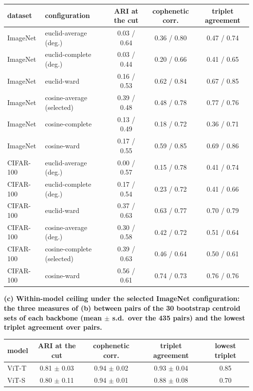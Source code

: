 \begin{table}[H]
\setlength{\tabcolsep}{3pt}
\begin{tabular}{ll|ccc}
\toprule
dataset & configuration & ARI at the cut & cophenetic corr. & triplet agreement \\
\midrule
ImageNet & euclid-average (deg.) & 0.03 / 0.64 & 0.36 / 0.80 & 0.47 / 0.74 \\
ImageNet & euclid-complete (deg.) & 0.03 / 0.44 & 0.20 / 0.66 & 0.41 / 0.65 \\
ImageNet & euclid-ward & 0.16 / 0.53 & 0.62 / 0.84 & 0.67 / 0.85 \\
ImageNet & cosine-average (selected) & 0.39 / 0.48 & 0.48 / 0.78 & 0.77 / 0.76 \\
ImageNet & cosine-complete & 0.13 / 0.49 & 0.18 / 0.72 & 0.36 / 0.71 \\
ImageNet & cosine-ward & 0.17 / 0.55 & 0.59 / 0.85 & 0.69 / 0.86 \\
\midrule
CIFAR-100 & euclid-average (deg.) & 0.00 / 0.57 & 0.15 / 0.78 & 0.41 / 0.74 \\
CIFAR-100 & euclid-complete (deg.) & 0.17 / 0.54 & 0.23 / 0.72 & 0.41 / 0.66 \\
CIFAR-100 & euclid-ward & 0.37 / 0.63 & 0.63 / 0.77 & 0.70 / 0.79 \\
CIFAR-100 & cosine-average (deg.) & 0.30 / 0.58 & 0.42 / 0.72 & 0.51 / 0.64 \\
CIFAR-100 & cosine-complete (selected) & 0.39 / 0.63 & 0.46 / 0.64 & 0.50 / 0.61 \\
CIFAR-100 & cosine-ward & 0.56 / 0.61 & 0.74 / 0.73 & 0.76 / 0.76 \\
\bottomrule
\end{tabular}
\par\vspace{5pt}
\endgroup
\begingroup
\noindent\textbf{(c) Within-model ceiling under the selected ImageNet configuration: the three measures of (b) between pairs of the 30 bootstrap centroid sets of each backbone (mean $\pm$ s.d.\ over the 435 pairs) and the lowest triplet agreement over pairs.}\par\vspace{1.5pt}
\footnotesize
\setlength{\tabcolsep}{4pt}
\begin{tabular}{lccc|c}
\toprule
model & ARI at the cut & cophenetic corr. & triplet agreement & lowest triplet \\
\midrule
ViT-T & 0.81 $\pm$ 0.03 & 0.94 $\pm$ 0.02 & 0.93 $\pm$ 0.04 & 0.85 \\
ViT-S & 0.80 $\pm$ 0.11 & 0.94 $\pm$ 0.01 & 0.88 $\pm$ 0.08 & 0.70 \\

\end{tabular}
\end{table}
